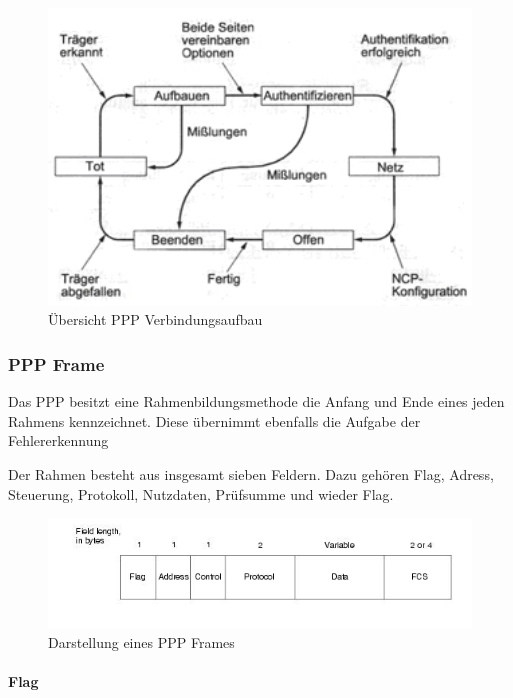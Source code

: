 \documentclass[12pt, a4paper, ngerman]{article}
\begin{document}
\begin{figure}[H]
	\centering
	\includegraphics[width=1\textwidth]{Grafiken/ppp.jpg}	
	\caption{Übersicht PPP Verbindungsaufbau \cite{*}}
	\label{aufbau_ppp-verbindung}
\end{figure}



\subsubsection{PPP Frame}

Das PPP besitzt eine Rahmenbildungsmethode die Anfang und Ende eines jeden Rahmens kennzeichnet. Diese übernimmt ebenfalls die Aufgabe der Fehlererkennung

Der Rahmen besteht aus insgesamt sieben Feldern. Dazu gehören Flag, Adress, Steuerung,  Protokoll, Nutzdaten, Prüfsumme und wieder Flag.

\begin{figure}[H]
	\centering
	\includegraphics[width=1\textwidth]{Grafiken/ppp-frame.jpg}	
	\caption{Darstellung eines PPP Frames \cite{*}}
	\label{ppp_frame}
\end{figure}

\paragraph{Flag}
\end{document}
